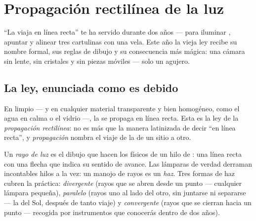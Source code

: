 \chapter{Propagación rectilínea de la luz}\label{ch:g6:light-propagation}

``La  viaja en línea recta'' te ha servido durante dos años ---
para iluminar , apuntar  y alinear tres
cartulinas con una vela. Este año la vieja ley recibe su nombre
formal, sus reglas de dibujo y su consecuencia más mágica: una cámara
sin lente, sin cristales y sin piezas móviles --- solo un agujero.

\section{La ley, enunciada como es debido}

\begin{proposition}\label{prop:g6:light-propagation:law}
En  limpio --- y en cualquier material transparente y bien
homogéneo, como el agua en calma o el vidrio ---, la  se
propaga en línea recta. Esta es la ley de la \emph{propagación
rectilínea}: \emph{} no es más
que la manera latinizada de decir ``en línea recta'', y
\emph{propagación} nombra el viaje de la  de un sitio a otro.
\end{proposition}

\begin{definition}\label{def:g6:light-propagation:ray}
Un \emph{rayo de luz} es el dibujo que hacen los
físicos de un hilo de : una línea recta con una flecha que
indica su sentido de avance. Las lámparas de verdad derraman
incontables hilos a la vez: un manojo de rayos es un
\emph{haz}. Tres formas de haz cubren la práctica:
\emph{divergente} (rayos que se abren desde un punto --- cualquier
lámpara pequeña), \emph{paralelo} (rayos uno al lado del otro, sin
juntarse ni separarse --- la  del Sol, después de tanto viaje) y
\emph{convergente} (rayos que se cierran hacia un punto --- 
recogida por instrumentos que conocerás dentro de dos años).
\end{definition}

